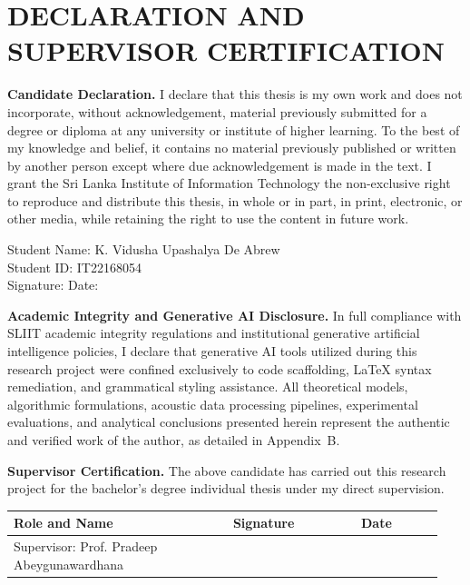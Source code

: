 \documentclass[12pt, a4paper]{report}
\begin{document}
\chapter*{DECLARATION AND SUPERVISOR CERTIFICATION}

\textbf{Candidate Declaration.} I declare that this thesis is my own work and does not incorporate, without acknowledgement, material previously submitted for a degree or diploma at any university or institute of higher learning. To the best of my knowledge and belief, it contains no material previously published or written by another person except where due acknowledgement is made in the text. I grant the Sri Lanka Institute of Information Technology the non-exclusive right to reproduce and distribute this thesis, in whole or in part, in print, electronic, or other media, while retaining the right to use the content in future work.
\vspace{0.6cm}

\noindent Student Name: K. Vidusha Upashalya De Abrew \\
Student ID: IT22168054 \\
Signature: \hrulefill \hspace{1cm} Date: \hrulefill
\vspace{1.0cm}

\noindent \textbf{Academic Integrity and Generative AI Disclosure.} In full compliance with SLIIT academic integrity regulations and institutional generative artificial intelligence policies, I declare that generative AI tools utilized during this research project were confined exclusively to code scaffolding, LaTeX syntax remediation, and grammatical styling assistance. All theoretical models, algorithmic formulations, acoustic data processing pipelines, experimental evaluations, and analytical conclusions presented herein represent the authentic and verified work of the author, as detailed in Appendix~B.
\vspace{1.0cm}

\noindent \textbf{Supervisor Certification.} The above candidate has carried out this research project for the bachelor's degree individual thesis under my direct supervision.
\vspace{0.6cm}

\begin{table}[htbp]
\centering
\begin{tabular}{@{} p{0.48\linewidth} p{0.28\linewidth} p{0.18\linewidth} @{}}
\toprule
\textbf{Role and Name} & \textbf{Signature} & \textbf{Date} \\
\midrule
Supervisor: Prof. Pradeep Abeygunawardhana & \hrulefill & \hrulefill \\
\bottomrule
\end{tabular}
\end{table}
\end{document}
